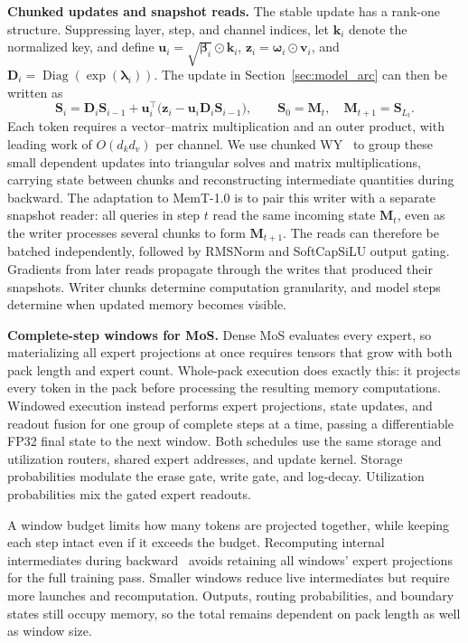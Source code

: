 \textbf{Chunked updates and snapshot reads.}
The stable update has a rank-one structure.
Suppressing layer, step, and channel indices, let $\mathbf{k}_i$ denote the normalized key, and define $\mathbf{u}_i=\sqrt{\boldsymbol{\beta}_i}\odot\mathbf{k}_i$, $\mathbf{z}_i=\boldsymbol{\omega}_i\odot\mathbf{v}_i$, and $\mathbf{D}_i=\operatorname{Diag}(\exp(\boldsymbol{\lambda}_i))$.
The update in Section~\ref{sec:model_arc} can then be written as
\begin{equation*}
\mathbf{S}_i=\mathbf{D}_i\mathbf{S}_{i-1}
+\mathbf{u}_i^\top\bigl(\mathbf{z}_i-\mathbf{u}_i\mathbf{D}_i\mathbf{S}_{i-1}\bigr),
\qquad
\mathbf{S}_0=\mathbf{M}_t,\quad \mathbf{M}_{t+1}=\mathbf{S}_{L_t}.
\end{equation*}
Each token requires a vector--matrix multiplication and an outer product, with leading work of $O(d_kd_v)$ per channel.
We use chunked WY~\cite{NEURIPS2024_d13a3eae} to group these small dependent updates into triangular solves and matrix multiplications, carrying state between chunks and reconstructing intermediate quantities during backward.
The adaptation to MemT-1.0 is to pair this writer with a separate snapshot reader: all queries in step $t$ read the same incoming state $\mathbf{M}_t$, even as the writer processes several chunks to form $\mathbf{M}_{t+1}$.
The reads can therefore be batched independently, followed by RMSNorm and SoftCapSiLU output gating.
Gradients from later reads propagate through the writes that produced their snapshots.
Writer chunks determine computation granularity, and model steps determine when updated memory becomes visible.

\textbf{Complete-step windows for MoS.}
Dense MoS evaluates every expert, so materializing all expert projections at once requires tensors that grow with both pack length and expert count.
Whole-pack execution does exactly this: it projects every token in the pack before processing the resulting memory computations.
Windowed execution instead performs expert projections, state updates, and readout fusion for one group of complete steps at a time, passing a differentiable FP32 final state to the next window.
Both schedules use the same storage and utilization routers, shared expert addresses, and update kernel.
Storage probabilities modulate the erase gate, write gate, and log-decay. Utilization probabilities mix the gated expert readouts.

A window budget limits how many tokens are projected together, while keeping each step intact even if it exceeds the budget.
Recomputing internal intermediates during backward~\cite{korthikanti2023reducing} avoids retaining all windows' expert projections for the full training pass.
Smaller windows reduce live intermediates but require more launches and recomputation.
Outputs, routing probabilities, and boundary states still occupy memory, so the total remains dependent on pack length as well as window size.

